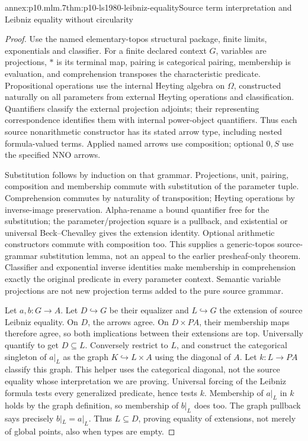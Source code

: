 \begin{annexitem}{annex:p10.mlm.7}{thm:p10-ls1980-leibniz-equality}{Source term interpretation and Leibniz equality without circularity}
\begin{proof}
Use the named elementary-topos structural package, finite limits,
exponentials and classifier. For a finite declared context \(G\), variables
are projections, \(*\) is its terminal map, pairing is categorical pairing,
membership is evaluation, and comprehension transposes the characteristic
predicate. Propositional operations use the internal Heyting algebra on
\(\Omega\), constructed naturally on all parameters from external Heyting
operations and classification. Quantifiers classify the external projection
adjoints; their representing correspondence identifies them with internal
power-object quantifiers. Thus each source nonarithmetic constructor has
its stated arrow type, including nested formula-valued terms. Applied named
arrows use composition; optional \(0,S\) use the specified NNO arrows.

Substitution follows by induction on that grammar. Projections, unit,
pairing, composition and membership commute with substitution of the
parameter tuple. Comprehension commutes by naturality of transposition;
Heyting operations by inverse-image preservation. Alpha-rename a bound
quantifier free for the substitution; the parameter/projection square is a
pullback, and existential or universal Beck--Chevalley gives the extension
identity. Optional arithmetic constructors commute with composition too.
This supplies a generic-topos source-grammar substitution lemma, not an
appeal to the earlier presheaf-only theorem. Classifier and exponential
inverse identities make membership in comprehension exactly the original
predicate in every parameter context. Semantic variable projections are
not new projection terms added to the pure source grammar.

Let \(a,b:G\to A\). Let \(D\hookrightarrow G\) be their equalizer and
\(L\hookrightarrow G\) the extension of source Leibniz equality.
On \(D\), the arrows agree. On \(D\times PA\), their membership maps
therefore agree, so both implications between their extensions are top.
Universally quantify to get \(D\subseteq L\).
Conversely restrict to \(L\), and construct the categorical singleton of
\(a|_L\) as the graph \(K\hookrightarrow L\times A\) using the diagonal of
\(A\). Let \(k:L\to PA\) classify this graph. This helper uses the
categorical diagonal, not the source equality whose interpretation we are
proving. Universal forcing of the Leibniz formula tests every generalized
predicate, hence tests \(k\). Membership of \(a|_L\) in \(k\) holds by the
graph definition, so membership of \(b|_L\) does too. The graph pullback
says precisely \(b|_L=a|_L\). Thus \(L\subseteq D\), proving equality of
extensions, not merely of global points, also when types are empty.


\end{proof}
\end{annexitem}
